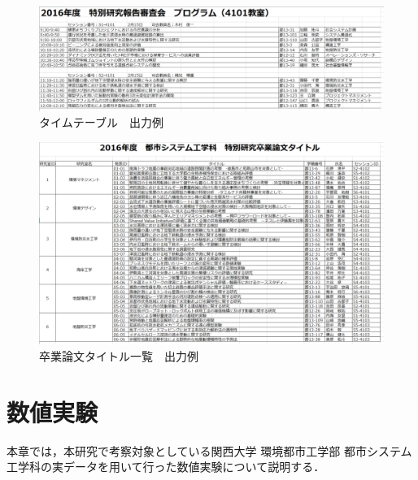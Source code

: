 \documentclass[a4paper,12pt,fleqn]{jarticle}
\begin{document}
\begin{figure}[H]
  \begin{center}
    \includegraphics[scale=0.57]{time.png}
    \caption{タイムテーブル　出力例}
    \label{fig:time}
  \end{center}
\end{figure}

\begin{figure}[H]
  \begin{center}
    \includegraphics[scale=0.65]{title.png}
    \caption{卒業論文タイトル一覧　出力例}
    \label{fig:title}
  \end{center}
\end{figure}

\newpage
 \section{数値実験}\label{sec:jikken}
 本章では，本研究で考察対象としている関西大学 環境都市工学部 都市システム工学科の実データを用いて行った数値実験について説明する．
\end{document}
